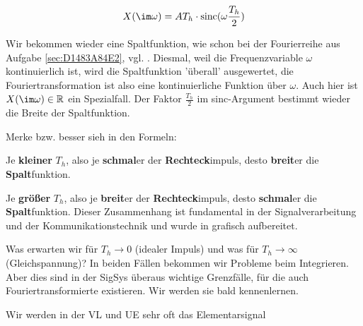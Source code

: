 \begin{Loesung}
\begin{equation}
\label{eq:8C3958BE4F_Loesung}
X(\im \omega) = A T_h \cdot \mathrm{sinc}(\omega \frac{T_h}{2})
\end{equation}

Wir bekommen wieder eine Spaltfunktion, wie schon bei der Fourierreihe aus Aufgabe
\ref{sec:D1483A84E2}, vgl. .
%
Diesmal, weil die Frequenzvariable $\omega$ kontinuierlich ist,
wird die Spaltfunktion 'überall' ausgewertet,
die Fouriertransformation ist also eine kontinuierliche Funktion über $\omega$.
%
Auch hier ist $X(\im\omega)\in\mathbb{R}$ ein Spezialfall.
%
Der Faktor $\frac{T_h}{2}$ im sinc-Argument bestimmt wieder die Breite der
Spaltfunktion.

Merke bzw. besser sieh in den Formeln:

Je \textbf{kleiner} $T_h$, also je \textbf{schmal}er der
\textbf{Rechteck}impuls, desto \textbf{breit}er die \textbf{Spalt}funktion.

Je \textbf{größer} $T_h$, also je \textbf{breit}er der
\textbf{Rechteck}impuls, desto \textbf{schmal}er die \textbf{Spalt}funktion.
%
Dieser Zusammenhang ist fundamental in der Signalverarbeitung und der
Kommunikationstechnik und wurde in  grafisch aufbereitet.

Was erwarten wir für $T_h\to 0$ (idealer Impuls) und was für $T_h\to \infty$
(Gleichspannung)? In beiden Fällen bekommen
wir Probleme beim Integrieren. Aber dies sind in der SigSys überaus wichtige
Grenzfälle, für die auch Fouriertransformierte existieren. Wir werden sie bald
kennenlernen.

Wir werden in der VL und UE sehr oft das Elementarsignal


\end{Loesung}
